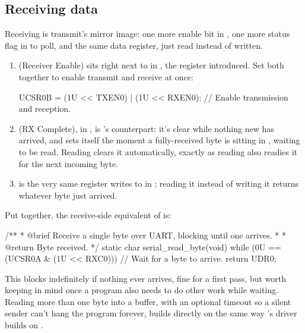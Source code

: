 \subsection{Receiving data}
\label{c6:a:7}
Receiving is transmit's mirror image: one more enable bit in , one more status flag
in  to poll, and the same  data register, just read instead of written.
\begin{enumerate}
  \item \textbf{} (Receiver Enable) sits right next to  in ,
    the register  introduced. Set both together to enable transmit and receive at
    once:

\begin{ccode}
UCSR0B = (1U << TXEN0) | (1U << RXEN0);   // Enable transmission and reception.
\end{ccode}

  \item \textbf{} (RX Complete), in , is 's counterpart: it's
    clear while nothing new has arrived, and sets itself the moment a fully-received byte is
    sitting in , waiting to be read. Reading  clears it automatically,
    exactly as reading  also readies it for the next incoming byte.
  \item \textbf{} is the very same register  writes to in
    ; reading it instead of writing it returns whatever byte just arrived.
\end{enumerate}
Put together, the receive-side equivalent of  is:

\begin{ccode}
/**
 * @brief Receive a single byte over UART, blocking until one arrives.
 *
 * @return Byte received.
 */
static char serial_read_byte(void)
{
    while (0U == (UCSR0A & (1U << RXC0))) {} // Wait for a byte to arrive.
    return UDR0;
}
\end{ccode}

\noindent This blocks indefinitely if nothing ever arrives, fine for a first pass, but worth
keeping in mind once a program also needs to do other work while waiting. Reading more than one
byte into a buffer, with an optional timeout so a silent sender can't hang the program forever,
builds directly on  the same way 's driver
 builds on .

